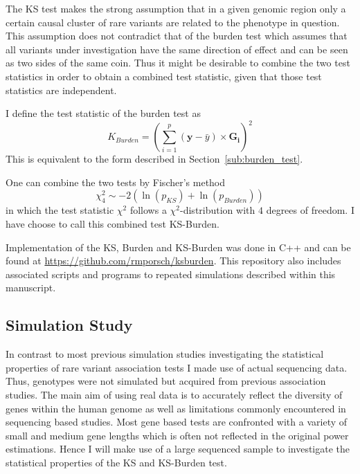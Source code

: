 The KS test makes the strong assumption that in a given genomic region only a certain causal cluster of rare variants are related to the phenotype in question.
This assumption does not contradict that of the burden test which assumes that all variants under investigation have the same direction of effect and can be seen as two sides of the same coin.
Thus it might be desirable to combine the two test statistics in order to obtain a combined test statistic, given that those test statistics are independent.

I define the test statistic of the burden test as 
\begin{equation}\label{eq:burden_simple}
  K_{Burden} = (\sum^p_{i=1} (\bm{y}-\bar{y}) \times \bm{G_i})^2
\end{equation}
This is equivalent to the form described in Section~\ref{sub:burden_test}.

One can combine the two tests by Fischer's method 
\begin{equation}
	\chi^2_4 \sim - 2 (\ln(p_{KS}) + \ln(p_{Burden}))
\end{equation}
in which the test statistic $\chi^2$ follows a $\chi^2$-distribution with $4$ degrees of freedom.
I have choose to call this combined test KS-Burden.

Implementation of the KS, Burden and KS-Burden was done in C++ and can be found at \url{https://github.com/rmporsch/ksburden}.
This repository also includes associated scripts and programs to repeated simulations described within this manuscript.

\subsection{Simulation Study}
\label{sub:simulation_study}

In contrast to most previous simulation studies investigating the statistical properties of rare variant association tests I made use of actual sequencing data.
Thus, genotypes were not simulated but acquired from previous association studies.
The main aim of using real data is to accurately reflect the diversity of genes within the human genome as well as limitations commonly encountered in sequencing based studies.
Most gene based tests are confronted with a variety of small and medium gene lengths which is often not reflected in the original power estimations.
Hence I will make use of a large sequenced sample to investigate the statistical properties of the KS and KS-Burden test.

